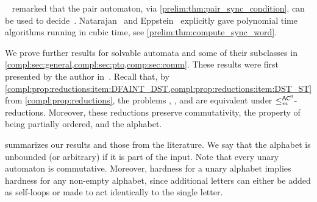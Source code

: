 \Cerny~\cite[Thm.~2]{Cer64} remarked that the pair automaton, via \cref{prelim:thm:pair_sync_condition},
can be used to decide~\DFAS. Natarajan~\cite{DBLP:conf/focs/Natarajan86} and Eppstein~\cite{Eppstein90} explicitly gave polynomial time algorithms running in cubic time, see \cref{prelim:thm:compute_sync_word}.

We prove further results for solvable automata and some of their subclasses in \cref{compl:sec:general,compl:sec:pto,comp:sec:comm}. These results were first presented by the author in~\cite{DBLP:journals/tcs/Hoffmann21,DBLP:conf/fun/FernauH022,DBLP:journals/jalc/000124}. Recall that, by \cref{compl:prop:reductions:item:DFAINT_DST,compl:prop:reductions:item:DST_ST} from \cref{compl:prop:reductions}, the problems \DFAINT, \ST, and \DST are equivalent under $\le_m^{\textup{\textsf{AC}}^0}$-reductions. Moreover, these reductions preserve commutativity, the property of being partially ordered, and the alphabet.

 summarizes our results and those from the literature. We say that the alphabet is unbounded (or arbitrary) if it is part of the input. Note that every unary automaton is commutative. Moreover, hardness for a unary alphabet implies hardness for any non-empty alphabet, since additional letters can either be added as self-loops or made to act identically to the single letter.

